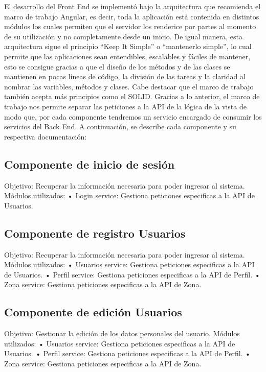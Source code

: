 El desarrollo del Front End se implementó bajo la arquitectura que recomienda el marco 
de trabajo Angular, es decir, toda la aplicación está contenida en distintos módulos los 
cuales permiten que el servidor los renderice por partes al momento de su utilización y no 
completamente desde un inicio.
De igual manera, esta arquitectura sigue el principio “Keep It Simple” o “mantenerlo 
simple”, lo cual permite que las aplicaciones sean entendibles, escalables y fáciles de 
mantener, esto se consigue gracias a que el diseño de los métodos y de las clases se 
mantienen en pocas líneas de código, la división de las tareas y la claridad al nombrar las 
variables, métodos y clases. Cabe destacar que el marco de trabajo también acepta más 
principios como el SOLID.
Gracias a lo anterior, el marco de trabajo nos permite separar las peticiones a la API de la 
lógica de la vista de modo que, por cada componente tendremos un servicio encargado de 
consumir los servicios del Back End.
\newline
A continuación, se describe cada componente y su respectiva documentación: 
\subsection{Componente de inicio de sesión}
Objetivo: Recuperar la información necesaria para poder ingresar al sistema.
Módulos utilizados: 
\newline
• Login service: Gestiona peticiones especificas a la API de Usuarios.
\subsection{Componente de registro Usuarios}
Objetivo: Recuperar la información necesaria para poder ingresar al sistema.
\newline
Módulos utilizados: 
\newline
• Usuarios service: Gestiona peticiones especificas a la API de Usuarios.
\newline
• Perfil service: Gestiona peticiones especificas a la API de Perfil.
\newline
• Zona service: Gestiona peticiones especificas a la API de Zona.
\subsection{Componente de edición Usuarios}
Objetivo: Gestionar la edición de los datos personales del usuario. 
\newline
Módulos utilizados: 
\newline
• Usuarios service: Gestiona peticiones especificas a la API de Usuarios.
\newline
• Perfil service: Gestiona peticiones especificas a la API de Perfil.
\newline
• Zona service: Gestiona peticiones especificas a la API de Zona.

